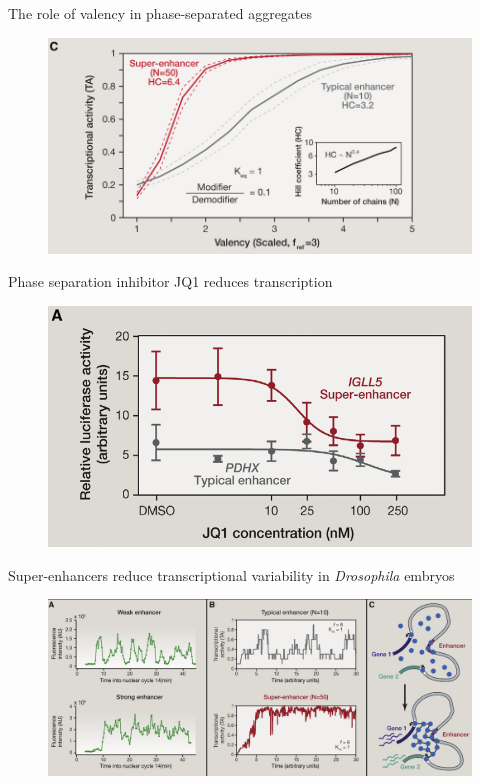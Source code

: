 \documentclass[aspectratio=1610]{beamer}					%
\begin{document}
\begin{frame}{The role of valency in phase-separated aggregates}
\begin{figure}
\includegraphics[width=14cm]{figure-5-4.png}
\end{figure}
\end{frame}

\begin{frame}{Phase separation inhibitor JQ1 reduces transcription}
\begin{figure}
\includegraphics[width=12cm]{figure-5-5.png}
\end{figure}
\end{frame}

\begin{frame}{Super-enhancers reduce transcriptional variability in \emph{Drosophila} embryos}
\begin{figure}
\includegraphics[width=14cm]{figure-5-7.png}
\end{figure}
\end{frame}
\end{document}

